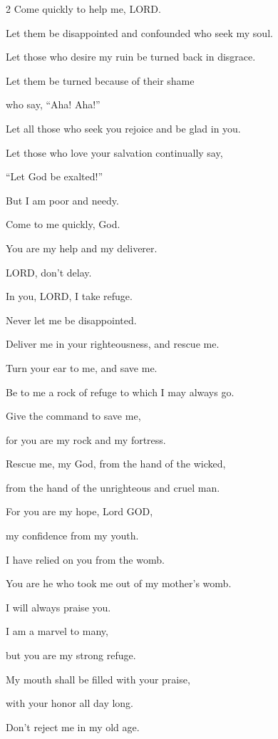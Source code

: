 \begin{multicols}{2}
	Come quickly to help me, LORD.
	
	
	\myverse{}Let them be disappointed and confounded who seek my soul.
	
	Let those who desire my ruin be turned back in disgrace.
	
	
	\myverse{}Let them be turned because of their shame
	
	who say, “Aha! Aha!”
	
	
	\myverse{}Let all those who seek you rejoice and be glad in you.
	
	Let those who love your salvation continually say,
	
	“Let God be exalted!”
	
	
	\myverse{}But I am poor and needy.
	
	Come to me quickly, God.
	
	You are my help and my deliverer.
	
	LORD, don’t delay.
	
	
	
	\mychapter{}\myverse*{}In you, LORD, I take refuge.
	
	\quad Never let me be disappointed.
	
	
	\myverse{}Deliver me in your righteousness, and rescue me.
	
	Turn your ear to me, and save me.
	
	
	\myverse{}Be to me a rock of refuge to which I may always go.
	
	Give the command to save me,
	
	for you are my rock and my fortress.
	
	
	\myverse{}Rescue me, my God, from the hand of the wicked,
	
	from the hand of the unrighteous and cruel man.
	
	
	\myverse{}For you are my hope, Lord GOD,
	
	my confidence from my youth.
	
	
	\myverse{}I have relied on you from the womb.
	
	You are he who took me out of my mother’s womb.
	
	I will always praise you.
	
	
	\myverse{}I am a marvel to many,
	
	but you are my strong refuge.
	
	
	\myverse{}My mouth shall be filled with your praise,
	
	with your honor all day long.
	
	
	\myverse{}Don’t reject me in my old age.
	

\end{multicols}
